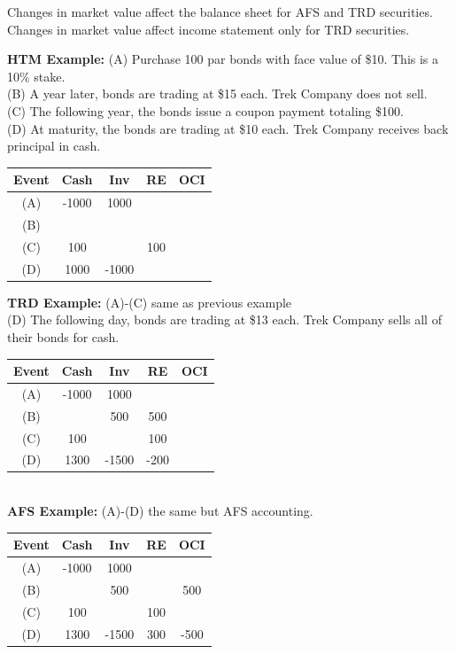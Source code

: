 Changes in market value affect the balance sheet for AFS and TRD securities. Changes in market value affect income statement only for TRD securities.

\textbf{HTM Example:}
(A) Purchase 100 par bonds with face value of \$10. This is a 10\% stake. \\
(B) A year later, bonds are trading at \$15 each. Trek Company does not sell. \\
(C) The following year, the bonds issue a coupon payment totaling \$100. \\
(D) At maturity, the bonds are trading at \$10 each. Trek Company receives back principal in cash.

	\begin{tabular}{ |c|c|c||c|c| } 
	\hline
	Event &  Cash & Inv & RE & OCI	 \\ 
	\hline
	(A)   & -1000   & 1000   &  &  \\
	(B)   &         &        &  &  \\
	(C)   &   100   &        & 100  &  \\
	(D)   &  1000   & -1000  &  &  \\    
    	
	\hline
	\end{tabular} 


\textbf{TRD Example:}
(A)-(C) same as previous example  \\
(D) The following day, bonds are trading at \$13 each. Trek Company sells all of their bonds for cash.

\begin{tabular}{ |c|c|c||c|c| } 
	\hline
	Event &  Cash & Inv & RE & OCI	 \\ 
	\hline
	(A)   & -1000   & 1000   &  &  \\
	(B)   &         & 500    & 500 &  \\
	(C)   &   100   &        & 100  &  \\
	(D)   &  1300   & -1500  & -200  &  \\ 
	\hline
\end{tabular} \\

\textbf{AFS Example:}
(A)-(D) the same but AFS accounting.\\

\begin{tabular}{ |c|c|c||c|c| } 
	\hline
	Event &  Cash & Inv & RE & OCI	 \\ 
	\hline
	(A)   & -1000   & 1000   &  &  \\
	(B)   &         & 500    &  & 500  \\
	(C)   &   100   &        & 100  &  \\
	(D)   &  1300   & -1500  & 300  & -500  \\ 
	\hline
\end{tabular}
	

